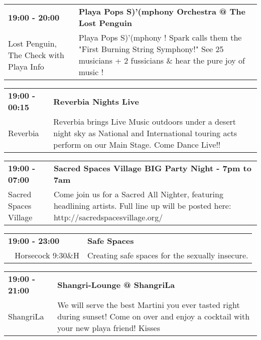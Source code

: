 \begin{tabular}{ p{1in} p{2.2in} }
    \textbf{19:00 - 20:00} & \textbf{Playa Pops S)'(mphony Orchestra @ The Lost Penguin} \\
    Lost Penguin, The \newline Check with Playa Info & Playa Pops S)'(mphony ! Spark calls them the "First Burning String Symphony!" See 25 musicians + 2 fussicians \& hear the pure joy of music ! \\
    \hline 
\end{tabular}
    
\begin{tabular}{ p{1in} p{2.2in} }
    \textbf{19:00 - 00:15} & \textbf{Reverbia Nights Live} \\
    Reverbia \newline  & Reverbia brings Live Music outdoors under a desert night sky as National and International touring acts perform on our Main Stage.  Come Dance Live!! \\
    \hline 
\end{tabular}
    
\begin{tabular}{ p{1in} p{2.2in} }
    \textbf{19:00 - 07:00} & \textbf{Sacred Spaces Village BIG Party Night - 7pm to 7am} \\
    Sacred Spaces Village \newline  & Come join us for a Sacred All Nighter, featuring headlining artists. Full line up will be posted here: http://sacredspacesvillage.org/ \\
    \hline 
\end{tabular}
    
\begin{tabular}{ p{1in} p{2.2in} }
    \textbf{19:00 - 23:00} & \textbf{Safe Spaces} \\
    ~ \newline Horsecock 9:30\&H & Creating safe spaces for the sexually insecure. \\
    \hline 
\end{tabular}
    
\begin{tabular}{ p{1in} p{2.2in} }
    \textbf{19:00 - 21:00} & \textbf{Shangri-Lounge @ ShangriLa} \\
    ShangriLa \newline  & We will serve the best Martini you ever tasted right during sunset! Come on over and enjoy a  cocktail with your new playa friend! Kisses \\
    \hline 
\end{tabular}
    
